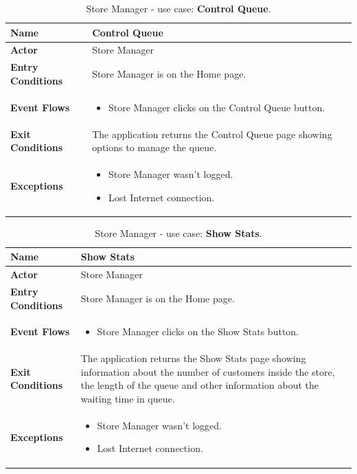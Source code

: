 \begin{table}[H]
\centering
\begin{tabular}{| m{} | m{} |} 
	\hline
	\textbf{Name} & Control Queue \\ 
	\hline
	\textbf{Actor} & Store Manager \\ 
	\hline
	\textbf{Entry Conditions} & Store Manager is on the Home page. \\ 
	\hline
	\textbf{Event Flows} &
	\begin{itemize}
	\item Store Manager clicks on the Control Queue button.
	\end{itemize} \\ 
	\hline
	\textbf{Exit Conditions} & The application returns the Control Queue page showing options to manage the queue. \\ 
	\hline
	\textbf{Exceptions} &
	\begin{itemize}
	\item Store Manager wasn't logged.
	\item Lost Internet connection.
	\end{itemize} \\ 
	\hline
\end{tabular}
\caption{Store Manager - use case: \textbf{Control Queue}.}
\label{tableGetStatus}
\end{table}

\begin{table}[H]
\centering
\begin{tabular}{| m{} | m{} |} 
	\hline
	\textbf{Name} & Show Stats \\ 
	\hline
	\textbf{Actor} & Store Manager \\ 
	\hline
	\textbf{Entry Conditions} & Store Manager is on the Home page. \\ 
	\hline
	\textbf{Event Flows} &
	\begin{itemize}
	\item Store Manager clicks on the Show Stats button.
	\end{itemize} \\ 
	\hline
	\textbf{Exit Conditions} & The application returns the Show Stats page showing information about the number of customers inside the store, the length of the queue and other information about the waiting time in queue. \\ 
	\hline
	\textbf{Exceptions} &
	\begin{itemize}
	\item Store Manager wasn't logged.
	\item Lost Internet connection.
	\end{itemize} \\ 
	\hline
\end{tabular}
\caption{Store Manager - use case: \textbf{Show Stats}.}
\label{tableGetStatus}
\end{table}


